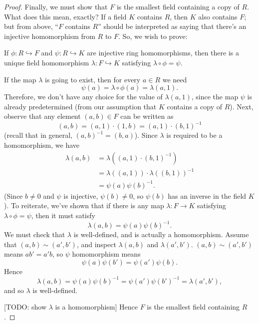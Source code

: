 \documentclass[math1530-lecture-notes]{subfiles}
\begin{document}
\begin{proof}[Proof]
  Finally, we must show that $F$ is the smallest field containing a copy of $R$. What does this mean,
  exactly? If a field $K$ contains $R$, then $K$ also contains $F$; but from above, ``$F$ contains
  $R$'' should be interpreted as saying that there's an injective homomorphism from $R$ to $F$. So,
  we wish to prove: \begin{center}
    If $\phi:R\hookrightarrow F$ and $\psi:R\hookrightarrow K$ are injective ring homomorphisms,
    then there is a unique field homomorphism $\lambda:F\hookrightarrow K$ satisfying $\lambda\circ
    \phi=\psi$.
  \end{center}
  If the map $\lambda$ is going to exist, then for every $a\in R$ we need \[
    \psi(a)=\lambda\circ \phi(a)=\lambda(a,1)
  .\] Therefore, we don't have any choice for the value of $\lambda(a,1)$, since the map $\psi$ is
  already predetermined (from our assumption that $K$ contains a copy of $R$). Next, observe that
  any element $(a,b)\in F$ can be written as \[
    (a,b)=(a,1)\cdot (1,b)=(a,1)\cdot (b,1)^{-1}
  \] (recall that in general, $(a,b)^{-1}=(b,a)$). Since $\lambda$ is required to be a homomorphism,
  we have
  \begin{align*}
    \lambda(a,b)&= \lambda((a,1)\cdot (b,1)^{-1}) \\
                &= \lambda((a,1))\cdot \lambda((b,1))^{-1} \\
                &= \psi(a)\psi(b)^{-1}
  .\end{align*}
  (Since $b\neq 0$ and $\psi$ is injective, $\psi(b)\neq 0$, so $\psi(b)$ has an inverse in the
  field $K$). To reiterate, we've shown that if there is any map $\lambda:F\to K$ satisfying
  $\lambda\circ \phi=\psi$, then it must satisfy \[
    \lambda(a,b)=\psi(a)\psi(b)^{-1}
  .\] We must check that $\lambda$ is well-defined, and is actually a homomorphism. Assume that
  $(a,b)\sim (a',b')$, and inspect $\lambda(a,b)$ and $\lambda(a',b')$. $(a,b)\sim (a',b')$ means
  $ab'=a'b$, so $\psi$ homomorphism means \[
    \psi(a)\psi(b')=\psi(a')\psi(b)
  .\] Hence \[
  \lambda(a,b)=\psi(a)\psi(b)^{-1}=\psi(a')\psi(b')^{-1}=\lambda(a',b')
  ,\] and so $\lambda$ is well-defined.

  [TODO: show $\lambda$ is a homomorphism] Hence $F$ is the smallest field containing $R$.
\end{proof}
\end{document}
